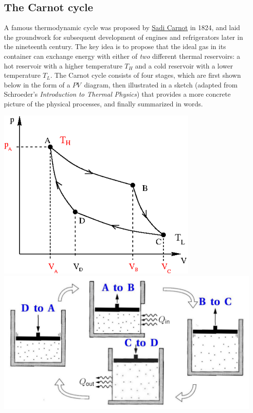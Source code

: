 \subsection{The Carnot cycle}
A famous thermodynamic cycle was proposed by \href{https://en.wikipedia.org/wiki/Nicolas_Leonard_Sadi_Carnot}{Sadi Carnot} in 1824, and laid the groundwork for subsequent development of engines and refrigerators later in the nineteenth century.
The key idea is to propose that the ideal gas in its container can exchange energy with either of \emph{two} different thermal reservoirs: a hot reservoir with a higher temperature $T_H$ and a cold reservoir with a lower temperature $T_L$. %
The Carnot cycle consists of four stages, which are first shown below in the form of a $PV$~diagram, then illustrated in a sketch (adapted from Schroeder's \textit{Introduction to Thermal Physics}) that provides a more concrete picture of the physical processes, and finally summarized in words.

\begin{center}
  \includegraphics[width=0.75\textwidth]{figs/unit05_carnot-PV.pdf} \\[36 pt]
  \includegraphics[width=\textwidth]{figs/unit05_carnot.pdf}
\end{center}

